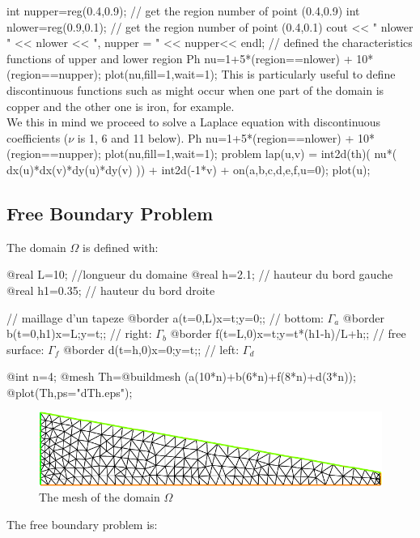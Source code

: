 \documentclass[a4paper,twoside,12pt]{book}
\begin{document}
int nupper=reg(0.4,0.9); // get the region number of point (0.4,0.9)
int nlower=reg(0.9,0.1);  // get the region number of point (0.4,0.1)
cout << " nlower " <<  nlower << ", nupper = " << nupper<< endl;
//  defined the characteristics functions of upper and lower region
Ph nu=1+5*(region==nlower) + 10*(region==nupper);
plot(nu,fill=1,wait=1);
\eFF
This is particularly useful to define discontinuous functions such as might occur
when one part of the domain is copper and the other one is iron, for example.
\\
We this in mind we proceed to solve a Laplace equation with discontinuous coefficients
($\nu$ is 1, 6 and 11 below).
\bFF
Ph nu=1+5*(region==nlower) + 10*(region==nupper);
plot(nu,fill=1,wait=1);
problem lap(u,v) =   int2d(th)( nu*( dx(u)*dx(v)*dy(u)*dy(v) ))
                   + int2d(-1*v) + on(a,b,c,d,e,f,u=0);
plot(u);
\eFF
{}
\newpage

\subsection{Free Boundary Problem}

The domain $\Omega$ is defined with:

\bFF
@real L=10;        //longueur du domaine
@real h=2.1;      // hauteur du bord gauche
@real h1=0.35;    // hauteur du bord droite

//  maillage d'un tapeze
@border a(t=0,L){x=t;y=0;};       // bottom:  $\Gamma_a$ \hfill
@border b(t=0,h1){x=L;y=t;};      // right:  $\Gamma_b$ \hfill
@border f(t=L,0){x=t;y=t*(h1-h)/L+h;}; //  free surface:  $\Gamma_f$ \hfill
@border d(t=h,0){x=0;y=t;};      // left:  $\Gamma_d$ \hfill

@int n=4;
@mesh Th=@buildmesh (a(10*n)+b(6*n)+f(8*n)+d(3*n));
@plot(Th,ps="dTh.eps");
\eFF


\begin{figure}[hbt]
\includegraphics[width=15cm]{dTh}
\caption{The mesh of the domain $\Omega$}
\end{figure}

The free boundary problem is:
\end{document}
